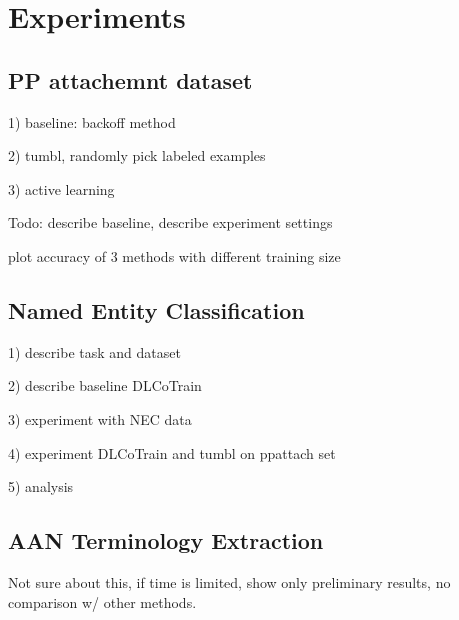 \section{Experiments}

\subsection{PP attachemnt dataset}


1) baseline: backoff method

2) tumbl, randomly pick labeled examples

3) active learning

Todo: describe baseline, describe experiment settings

plot accuracy of 3 methods with different training size


\subsection{Named Entity Classification}

1) describe task and dataset

2) describe baseline DLCoTrain

3) experiment with NEC data

4) experiment DLCoTrain and tumbl on ppattach set

5) analysis


\subsection{AAN Terminology Extraction}

Not sure about this, if time is limited, show only preliminary
results, no comparison w/ other methods.
